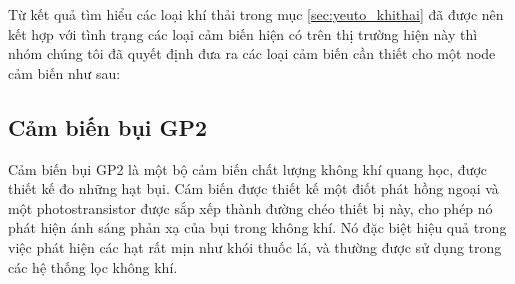 Từ kết quả tìm hiểu các loại khí thải trong mục \ref{sec:yeuto_khithai} đã được nên kết hợp với tình trạng các loại cảm biến hiện có trên thị trường hiện này thì nhóm chúng tôi đã quyết định đưa ra các loại cảm biến cần thiết cho một node cảm biến như sau:



\subsection*{Cảm biến bụi GP2} 
Cảm biến bụi GP2 là một bộ cảm biến chất lượng không khí quang học, được thiết kế đo những hạt bụi. Cám biến được thiết kế một điốt phát hồng ngoại và một photostransistor được sắp xếp thành đường chéo thiết bị này, cho phép nó phát hiện ánh sáng phản xạ của bụi trong không khí.  Nó đặc biệt hiệu quả trong việc phát hiện các hạt rất mịn như khói thuốc lá, và thường được sử dụng trong các hệ thống lọc không khí.

